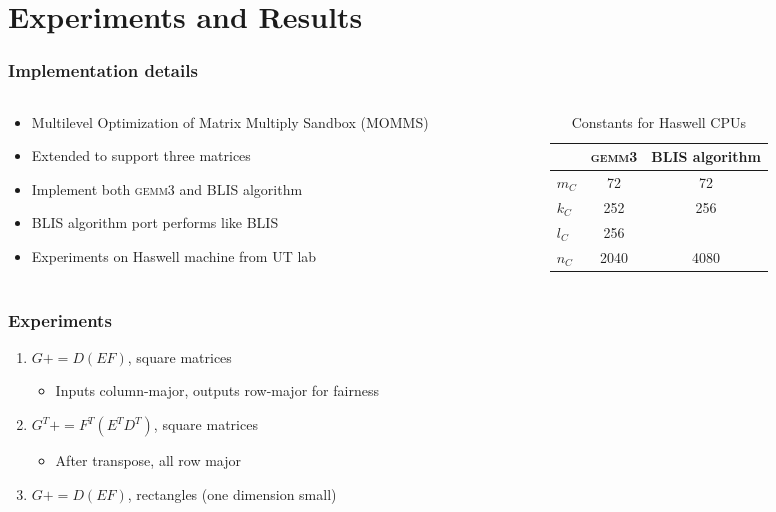\documentclass{beamer}
\newcommand*{\pluseq}{\mathrel{{+}{=}}}
\newcommand*{\gemmt}{{\textsc{gemm3}}}
\begin{document}
\section[Results]{Experiments and Results}
\frame{\sectionpage}

\begin{frame}
  \frametitle{Implementation details}
  \begin{columns}
    \begin{column}{0.5\textwidth}
      \begin{itemize}
      \item Multilevel Optimization of Matrix Multiply Sandbox (MOMMS)
      \item Extended to support three matrices
      \item Implement both \gemmt{} and BLIS algorithm
      \item BLIS algorithm port performs like BLIS
      \item Experiments on Haswell machine from UT lab
      \end{itemize}
    \end{column}
    \begin{column}{0.5\textwidth}
      \begin{table}
        \centering
        \begin{tabular}{l|c c}
          &\gemmt{}&BLIS algorithm\\ \hline
          $m_C$&72&72\\
          $k_C$&252&256\\
          $l_C$&256&\\
          $n_C$&2040&4080\\
        \end{tabular}
        \caption{Constants for Haswell CPUs}
        \label{tab:haswell-consts}
      \end{table}
    \end{column}
  \end{columns}
\end{frame}

\begin{frame}
  \frametitle{Experiments}
  \begin{enumerate}
  \item $G \pluseq D(EF)$, square matrices
    \begin{itemize}
    \item Inputs column-major, outputs row-major for fairness
    \end{itemize}
  \item $G^T \pluseq F^T(E^TD^T)$, square matrices
    \begin{itemize}
    \item After transpose, all row major
    \end{itemize}
  \item $G \pluseq D(EF)$, rectangles (one dimension small)
  \end{enumerate}
\end{frame}
\end{document}
